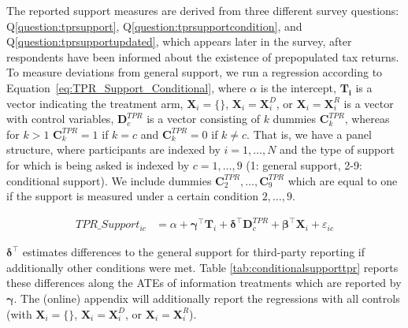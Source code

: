\documentclass[11pt]{article}
\begin{document}
The reported support measures are derived from three different survey questions: Q\ref{question:tprsupport}, Q\ref{question:tprsupportcondition}, and Q\ref{question:tprsupportupdated}, which appears later in the survey, after respondents have been informed about the existence of prepopulated tax returns. To measure deviations from general support, we run a regression according to Equation~\ref{eq:TPR_Support_Conditional}, where $\alpha$ is the intercept, $\mathbf{T_i}$ is a vector indicating the treatment arm, $\mathbf{X}_{i} = \{\}$, $\mathbf{X}_{i} = \mathbf{X}_{i}^{D}$, or  $\mathbf{X}_{i} = \mathbf{X}_{i}^{R}$ is a vector with control variables, $\mathbf{D}_c^{TPR}$ is a vector consisting of $k$ dummies $\mathbf{C}_k^{TPR}$, whereas for $k>1$ $\mathbf{C}_k^{TPR}=1$ if $k=c$ and $\mathbf{C}_k^{TPR}=0$ if $k \neq c$. That is, we have a panel structure, where participants are indexed by $i=1,\ldots,N$ and the type of support for which is being asked is indexed by $c=1,\ldots,9$ (1: general support, 2-9: conditional support). We include dummies $\mathbf{C}_2^{TPR},\ldots, \mathbf{C}_9^{TPR}$ which are equal to one if the support is measured under a certain condition $2,\ldots,9$. 
\begin{center}
\begin{align}
    \label{eq:TPR_Support_Conditional}
    \text{$TPR\_Support_{ic}$}
    &= \alpha + \boldsymbol{\gamma}^{\top}\mathbf{T}_i + \boldsymbol{\delta}^{\top}\mathbf{D}_c^{TPR}+ \boldsymbol{\beta}^{\top}\mathbf{X}_{i} + \varepsilon_{ic}
\end{align}
\end{center}

$\boldsymbol{\delta}^{\top}$ estimates differences to the general support for third-party reporting if additionally other conditions were met. Table \ref{tab:conditionalsupporttpr} reports these differences along the ATEs of information treatments which are reported by $\boldsymbol{\gamma}$. The (online) appendix will additionally report the regressions with all controls (with $\mathbf{X}_{i} = \{\}$, $\mathbf{X}_{i} = \mathbf{X}_{i}^{D}$, or  $\mathbf{X}_{i} = \mathbf{X}_{i}^{R}$).
\end{document}

